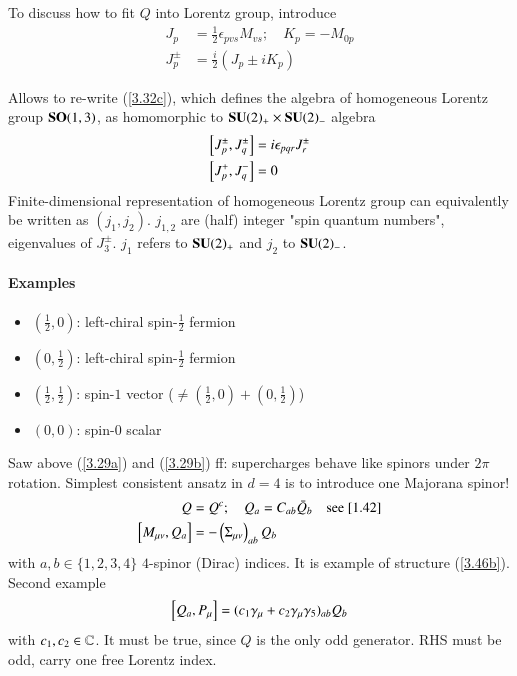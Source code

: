 To discuss how to fit $Q$ into Lorentz group, introduce
\begin{align}
   J_p &= \frac{1}{2} \epsilon_{pvs} M_{vs}; \quad K_p = - M_{0p} \label{3.47} \\
   J_p^\pm &= \frac{i}{2} (J_p \pm i K_p) \label{3.48}
\end{align}

Allows to re-write (\ref{3.32c}), which defines the algebra of homogeneous Lorentz group $\mathbf{SO}(1,3)$, as homomorphic to $\mathbf{SU}(2)_+ \times \mathbf{SU}(2)_-$ algebra
\begin{align*}
   \comm{J^{\pm}_p}{J^\pm_q} &= i \epsilon_{pqr} J^\pm_r \\
   \comm{J^+_p}{J^-_q} &= 0
\end{align*}
Finite-dimensional representation of homogeneous Lorentz group can equivalently be written as $(j_1, j_2)$. $j_{1,2}$ are (half) integer "spin quantum numbers", eigenvalues of $J_3^\pm$. $j_1$ refers to $\mathbf{SU}(2)_+$ and $j_2$ to $\mathbf{SU}(2)_-$.
\paragraph{Examples}
\begin{itemize}
   \item $(\frac{1}{2}, 0)$: left-chiral spin-$\frac{1}{2}$ fermion
   \item $(0, \frac{1}{2})$: left-chiral spin-$\frac{1}{2}$ fermion
   \item $(\frac{1}{2}, \frac{1}{2})$: spin-$1$ vector ($\neq (\frac{1}{2}, 0) + (0, \frac{1}{2})$)
   \item $(0,0)$: spin-$0$ scalar
\end{itemize}
Saw above (\ref{3.29a}) and (\ref{3.29b}) ff: supercharges behave like spinors under $2\pi$ rotation. Simplest consistent ansatz in $d=4$ is to introduce one Majorana spinor!
\begin{align}
   Q &= Q^c; \quad Q_a = C_{ab} \bar{Q}_b \quad \text{see \ref{1.42}}\label{3.50} \\
   \comm{M_{\mu\nu}}{Q_a} &= - \left( \Sigma_{\mu\nu} \right)_{ab} Q_b \label{3.51}
\end{align}
with $a,b \in \{1,2,3,4\}$ $4$-spinor (Dirac) indices. It is example of structure (\ref{3.46b}). Second example
\begin{equation}
   \comm{Q_a}{P_\mu} = (c_1 \gamma_\mu + c_2 \gamma_\mu \gamma_5)_{ab} Q_b \label{3.52}
\end{equation}
with $c_1, c_2 \in \mathbb{C}$. It must be true, since $Q$ is the only odd generator. RHS must be odd, carry one free Lorentz index.

